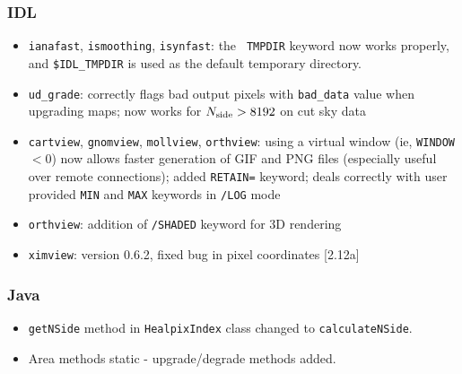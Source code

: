 \documentclass[12pt,twoside]{article}
\newcommand{\nside}{{N_{\rm side}}}
\begin{document}
\subsubsection[IDL]{IDL}
	\begin{itemize}
	\item {\tt ianafast}, {\tt ismoothing}, {\tt isynfast}: the {\tt
TMPDIR} keyword now works properly, and {\tt \$IDL\_TMPDIR} is used as the
default temporary directory.
	\item {\tt ud\_grade}: correctly flags bad output pixels with {\tt bad\_data}
value when upgrading maps; now works for
$\nside >  8192$ on cut sky data
	\item {\tt cartview}, {\tt gnomview}, {\tt mollview}, {\tt orthview}:
using a virtual window (ie, {\tt WINDOW}$<0$) now allows faster generation 
of GIF and PNG files (especially useful over remote connections); 
added {\tt RETAIN=} keyword; deals correctly with user provided 
{\tt MIN} and {\tt MAX} keywords in {\tt /LOG} mode
	\item {\tt orthview}: addition of {\tt /SHADED} keyword for 3D
rendering
	\item {\tt ximview}: version 0.6.2, fixed bug in pixel
coordinates [2.12a]
	\end{itemize}

\subsubsection[Java]{Java}
	\begin{itemize}
	\item {\tt getNSide} method in {\tt HealpixIndex} class changed to {\tt calculateNSide}.
	\item Area methods static - upgrade/degrade methods added.
	\end{itemize}

\end{document}

